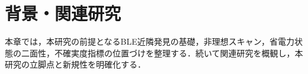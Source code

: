 ﻿%
\chapter{背景・関連研究}
\label{ch:background_related}
\clearpage

本章では，本研究の前提となるBLE近隣発見の基礎，非理想スキャン，省電力状態の二面性，不確実度指標の位置づけを整理する．続いて関連研究を概観し，本研究の立脚点と新規性を明確化する．





